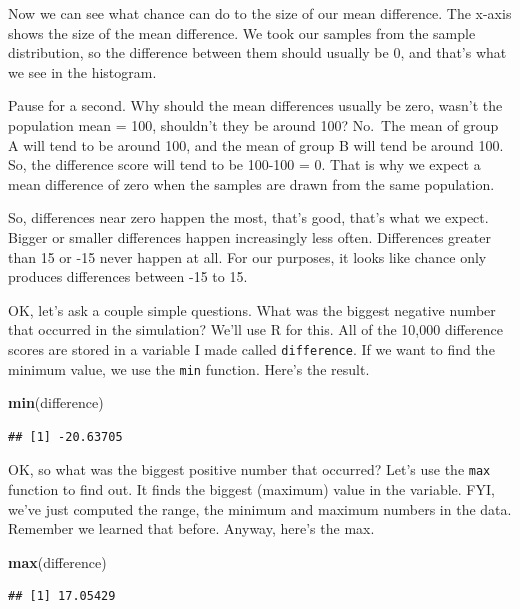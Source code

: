 \documentclass[
]{book}
\newenvironment{Shaded}{\begin{snugshade}}{\end{snugshade}}
\newcommand{\KeywordTok}[1]{\textcolor[rgb]{0.13,0.29,0.53}{\textbf{#1}}}
\newcommand{\NormalTok}[1]{#1}
\begin{document}
Now we can see what chance can do to the size of our mean difference. The x-axis shows the size of the mean difference. We took our samples from the sample distribution, so the difference between them should usually be 0, and that's what we see in the histogram.

Pause for a second. Why should the mean differences usually be zero, wasn't the population mean = 100, shouldn't they be around 100? No.~The mean of group A will tend to be around 100, and the mean of group B will tend be around 100. So, the difference score will tend to be 100-100 = 0. That is why we expect a mean difference of zero when the samples are drawn from the same population.

So, differences near zero happen the most, that's good, that's what we expect. Bigger or smaller differences happen increasingly less often. Differences greater than 15 or -15 never happen at all. For our purposes, it looks like chance only produces differences between -15 to 15.

OK, let's ask a couple simple questions. What was the biggest negative number that occurred in the simulation? We'll use R for this. All of the 10,000 difference scores are stored in a variable I made called \texttt{difference}. If we want to find the minimum value, we use the \texttt{min} function. Here's the result.

\begin{Shaded}
\begin{Highlighting}[]
\KeywordTok{min}\NormalTok{(difference)}
\end{Highlighting}
\end{Shaded}

\begin{verbatim}
## [1] -20.63705
\end{verbatim}

OK, so what was the biggest positive number that occurred? Let's use the \texttt{max} function to find out. It finds the biggest (maximum) value in the variable. FYI, we've just computed the range, the minimum and maximum numbers in the data. Remember we learned that before. Anyway, here's the max.

\begin{Shaded}
\begin{Highlighting}[]
\KeywordTok{max}\NormalTok{(difference)}
\end{Highlighting}
\end{Shaded}

\begin{verbatim}
## [1] 17.05429
\end{verbatim}
\end{document}
